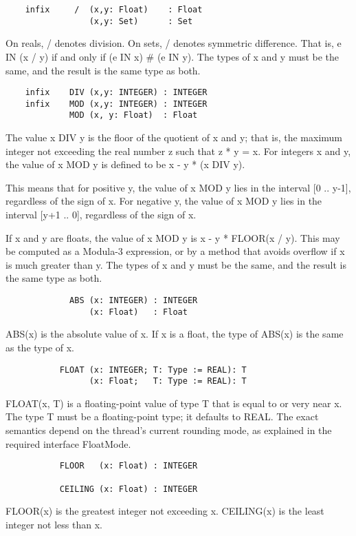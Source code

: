\documentclass[10pt]{article}
\begin{document}
\begin{verbatim}
    infix     /  (x,y: Float)    : Float
                 (x,y: Set)      : Set
\end{verbatim}
On reals, / denotes division.  On sets, / denotes symmetric difference.  That
is, e IN (x / y) if and only if (e IN x) \# (e IN y).  The types of x and y
must be the same, and the result is the same type as both.

\begin{verbatim}
    infix    DIV (x,y: INTEGER) : INTEGER
    infix    MOD (x,y: INTEGER) : INTEGER
             MOD (x, y: Float)  : Float
\end{verbatim}
The value x DIV y is the floor of the quotient of x and y; that is, the
maximum integer not exceeding the real number z such that z * y = x.  For
integers x and y, the value of x MOD y is defined to be x - y * (x DIV y).

This means that for positive y, the value of x MOD y lies in the interval [0
..  y-1], regardless of the sign of x.  For negative y, the value of x MOD y
lies in the interval [y+1 ..  0], regardless of the sign of x.

If x and y are floats, the value of x MOD y is x - y * FLOOR(x / y).  This may
be computed as a Modula-3 expression, or by a method that avoids overflow if x
is much greater than y.  The types of x and y must be the same, and the result
is the same type as both.

\begin{verbatim}
             ABS (x: INTEGER) : INTEGER
                 (x: Float)   : Float
\end{verbatim}
ABS(x) is the absolute value of x.  If x is a float, the type of ABS(x) is the
same as the type of x.

\begin{verbatim}
           FLOAT (x: INTEGER; T: Type := REAL): T
                 (x: Float;   T: Type := REAL): T
\end{verbatim}
FLOAT(x, T) is a floating-point value of type T that is equal to or very near
x.  The type T must be a floating-point type; it defaults to REAL.  The exact
semantics depend on the thread's current rounding mode, as explained in the
required interface FloatMode.

\begin{verbatim}
           FLOOR   (x: Float) : INTEGER

           CEILING (x: Float) : INTEGER
\end{verbatim}
FLOOR(x) is the greatest integer not exceeding x.  CEILING(x) is the least
integer not less than x.
\end{document}
